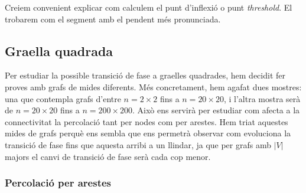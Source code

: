 \documentclass[a4paper]{article}
\begin{document}
	Creiem convenient explicar com calculem el punt d'inflexió o punt \textit{threshold}. El trobarem com el segment amb el pendent més pronunciada.
	
	\subsection{Graella quadrada}
	
	Per estudiar la possible transició de fase a graelles quadrades, hem decidit fer proves amb grafs de mides diferents. Més concretament, hem agafat dues mostres: una que contempla grafs d'entre $n = 2 \times 2$ fins a $n = 20 \times 20$, i l'altra mostra serà de $n = 20 \times 20$ fins a $n = 200 \times 200$. Això ens servirà per estudiar com afecta a la connectivitat la percolació tant per nodes com per arestes. Hem triat aquestes mides de grafs perquè ens sembla que ens permetrà observar com evoluciona la transició de fase fins que aquesta arribi a un llindar, ja que per grafs amb $|V|$ majors el canvi de transició de fase serà cada cop menor. \\
	
	\subsubsection{Percolació per arestes}
	
\end{document}
